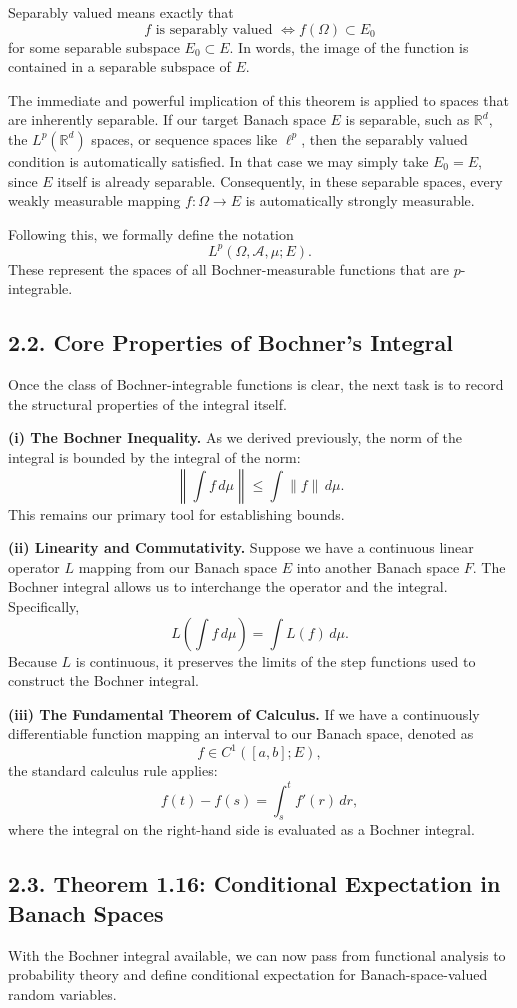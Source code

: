 \documentclass[11pt]{article}
\theoremstyle{definition}
\theoremstyle{remark}
\begin{document}
Separably valued means exactly that
\[
f \text{ is separably valued }
\Longleftrightarrow
f(\Omega)\subset E_0
\]
for some separable subspace \(E_0\subset E\).
In words, the image of the function is contained in a separable subspace of \(E\).

The immediate and powerful implication of this theorem is applied to spaces that are inherently separable. If our target Banach space \(E\) is separable, such as \(\mathbb R^d\), the \(L^p(\mathbb R^d)\) spaces, or sequence spaces like \(\ell^p\), then the separably valued condition is automatically satisfied. In that case we may simply take \(E_0=E\), since \(E\) itself is already separable. Consequently, in these separable spaces, every weakly measurable mapping \(f:\Omega\to E\) is automatically strongly measurable.

Following this, we formally define the notation
\[
L^p(\Omega,\mathcal A,\mu;E).
\]
These represent the spaces of all Bochner-measurable functions that are \(p\)-integrable.

\subsection*{2.2. Core Properties of Bochner's Integral}
Once the class of Bochner-integrable functions is clear, the next task is to record the structural properties of the integral itself.

\textbf{(i) The Bochner Inequality.} As we derived previously, the norm of the integral is bounded by the integral of the norm:
\[
\left\|\int f\,d\mu\right\|\le \int \|f\|\,d\mu.
\]
This remains our primary tool for establishing bounds.

\textbf{(ii) Linearity and Commutativity.} Suppose we have a continuous linear operator \(L\) mapping from our Banach space \(E\) into another Banach space \(F\). The Bochner integral allows us to interchange the operator and the integral. Specifically,
\[
L\left(\int f\,d\mu\right)=\int L(f)\,d\mu.
\]
Because \(L\) is continuous, it preserves the limits of the step functions used to construct the Bochner integral.

\textbf{(iii) The Fundamental Theorem of Calculus.} If we have a continuously differentiable function mapping an interval to our Banach space, denoted as
\[
f\in C^1([a,b];E),
\]
the standard calculus rule applies:
\[
f(t)-f(s)=\int_s^t f'(r)\,dr,
\]
where the integral on the right-hand side is evaluated as a Bochner integral.

\subsection*{2.3. Theorem 1.16: Conditional Expectation in Banach Spaces}
With the Bochner integral available, we can now pass from functional analysis to probability theory and define conditional expectation for Banach-space-valued random variables.
\end{document}
